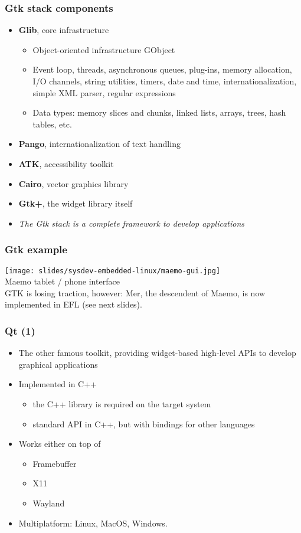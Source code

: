 \begin{frame}
  \frametitle{Gtk stack components}
  \begin{itemize}
  \item {\bf Glib}, core infrastructure
    \begin{itemize}
    \item Object-oriented infrastructure GObject
    \item Event loop, threads, asynchronous queues, plug-ins, memory
      allocation, I/O channels, string utilities, timers, date and
      time, internationalization, simple XML parser, regular
      expressions
    \item Data types: memory slices and chunks, linked lists, arrays,
      trees, hash tables, etc.
    \end{itemize}
  \item {\bf Pango}, internationalization of text handling
  \item {\bf ATK}, accessibility toolkit
  \item {\bf Cairo}, vector graphics library
  \item {\bf Gtk+}, the widget library itself
  \item {\em The Gtk stack is a complete framework to develop applications}
  \end{itemize}
\end{frame}

\begin{frame}
  \frametitle{Gtk example}
    \texttt{[image: slides/sysdev-embedded-linux/maemo-gui.jpg]}\\
    Maemo tablet / phone interface\\
    GTK is losing traction, however:
    Mer, the descendent of Maemo, is now implemented in EFL (see next
    slides).\\
\end{frame}

\begin{frame}
  \frametitle{Qt (1)}
  \begin{itemize}
  \item The other famous toolkit, providing widget-based high-level APIs to
    develop graphical applications
  \item Implemented in C++
    \begin{itemize}
    \item the C++ library is required on the target system
    \item standard API in C++, but with bindings for other languages
    \end{itemize}
  \item Works either on top of
    \begin{itemize}
    \item Framebuffer
    \item X11
    \item Wayland
    \end{itemize}
  \item Multiplatform: Linux, MacOS, Windows.
  \end{itemize}
\end{frame}

